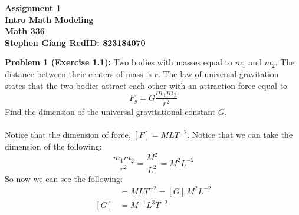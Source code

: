 \documentclass[11pt]{article}
\newenvironment{problem}[1]{\textbf{Problem #1: }}{\newpage}
\begin{document}
	
	\begin{center}
		\textbf{Assignment 1} \\
		\textbf{Intro Math Modeling} \\
		\textbf{Math 336} \\
		\textbf{Stephen Giang RedID: 823184070} \\
	\end{center}

	\begin{problem}{1 (Exercise 1.1)}
		Two bodies with masses equal to $m_1$ and $m_2$. The distance between their centers of mass is $r$. The law of universal gravitation states that the two bodies attract each other with an attraction force equal to
		\[F_g = G \frac{m_1m_2}{r^2} \tag{1.77}\]
		Find the dimension of the universal gravitational constant $G$.
		\\ \\
		Notice that the dimension of force, ${[F]} = MLT^{-2}$.  Notice that we can take the dimension of the following:
		\[\frac{m_1m_2}{r^2} = \frac{M^2}{L^{2}} = M^2L^{-2}\]
		So now we can see the following:
		\begin{align*}
			[F] &= MLT^{-2} = [G]\,M^2L^{-2} \\
			[G] &= M^{-1}L^{3}T^{-2}
		\end{align*}
	\end{problem}
\end{document}
